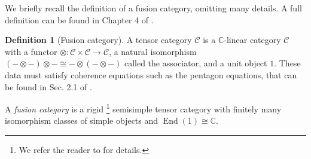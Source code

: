 \documentclass[aps,prb,twocolumn,superscriptaddress,noshowkeys]{revtex4-1}  %
\DeclareMathOperator{\End}{End}
\newcommand{\cat}{\mathcal{C}}
\theoremstyle{plain}%
\theoremstyle{definition}
\newtheorem{definition}{Definition}[section]
\theoremstyle{remark}
\begin{document}
We briefly recall the definition of a fusion category, omitting many details. A full definition can be found in Chapter 4 of \cite{Etingof2015}.
\begin{definition}[Fusion category]
	A tensor category $\cat$ is a $\mathbb{C}$-linear category $\cat$ with a functor $\otimes:\cat\times\cat\to\cat$, a natural isomorphism $(-\otimes-)\otimes-\cong-\otimes(-\otimes-)$ called the associator, and a unit object $1$.
	These data must satisfy coherence equations such as the pentagon equations, that can be found in Sec. 2.1 of \cite{Etingof2015}.
	
	A \emph{fusion category} is a rigid \footnote{We refer the reader to \cite{Etingof2015} for details.} semisimple tensor category with finitely many isomorphism classes of simple objects and $\End(1)\cong \mathbb{C}$.
	

\end{definition}
\end{document}
